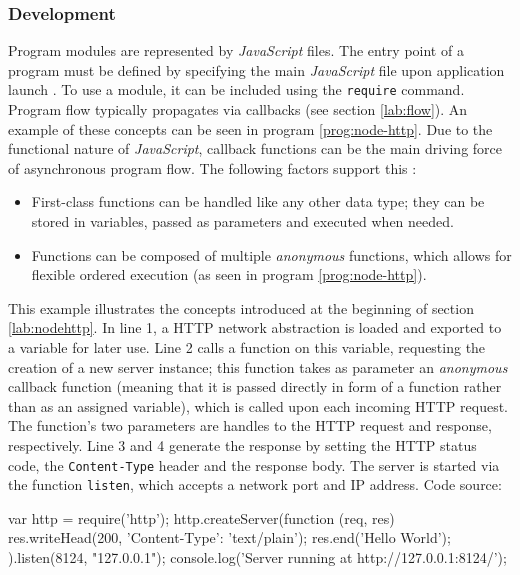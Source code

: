 \subsubsection*{Development}
\label{lab:nodehttp}
Program modules are represented by \textit{JavaScript} files. The entry point of a program must be defined by specifying the main \textit{JavaScript} file upon application launch \cite[p. 16]{Hughes-Croucher2012}. To use a module, it can be included using the \texttt{require} command. Program flow typically propagates via callbacks (see section \ref{lab:flow}). An example of these concepts can be seen in program \ref{prog:node-http}. Due to the functional nature of \textit{JavaScript}, callback functions can be the main driving force of asynchronous program flow. The following factors support this \cite{node-loop}:
\begin{itemize}
  \item First-class functions can be handled like any other data type; they can be stored in variables, passed as parameters and executed when needed.
  \item Functions can be composed of multiple \textit{anonymous} functions, which allows for flexible ordered execution (as seen in program \ref{prog:node-http}).
\end{itemize}
\begin{program}
  \caption{This example illustrates the concepts introduced at the beginning of section \ref{lab:nodehttp}. In line 1, a HTTP network abstraction is loaded and exported to a variable for later use. Line 2 calls a function on this variable, requesting the creation of a new server instance; this function takes as parameter an \textit{anonymous} callback function (meaning that it is passed directly in form of a function rather than as an assigned variable), which is called upon each incoming HTTP request. The function's two parameters are handles to the HTTP request and response, respectively. Line 3 and 4 generate the response by setting the HTTP status code, the \texttt{Content-Type} header and the response body. The server is started via the function \texttt{listen}, which accepts a network port and IP address. Code source: \cite[p. 9]{Hughes-Croucher2012}}
  \label{prog:node-http}
  \begin{JavaCode}
var http = require('http');
http.createServer(function (req, res) {
    res.writeHead(200, {'Content-Type': 'text/plain'}); 
    res.end('Hello World\n');
}).listen(8124, "127.0.0.1");
console.log('Server running at http://127.0.0.1:8124/');
  \end{JavaCode}
\end{program}
